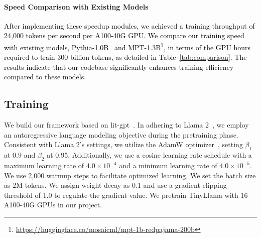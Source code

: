 \documentclass{article}
\begin{document}
\paragraph{Speed Comparison with Existing Models}
\textcolor{black}{
After implementing these speedup modules,
    we achieved a training throughput of 24,000 tokens per second per A100-40G GPU.
We compare our training speed with existing models,
    Pythia-1.0B~\citep{biderman2023pythia} and MPT-1.3B\footnote{\url{https://huggingface.co/mosaicml/mpt-1b-redpajama-200b}},
    in terms of the GPU hours required to train 300 billion tokens, as detailed in Table~\ref{tab:comparison}.
The results indicate that our codebase significantly enhances training efficiency compared to these models.
}
\vspace{-0.5em}
\subsection{Training}
We build our framework based on lit-gpt~\citep{lit-gpt}.
In adhering to Llama 2~\citep{touvron2023llama2}, we employ an autoregressive language modeling objective during the pretraining phase.
Consistent with Llama 2's settings, we utilize the AdamW optimizer~\citep{DBLP:conf/iclr/LoshchilovH19}, setting $\beta_1$ at 0.9 and
$\beta_2 $ at 0.95.
Additionally, we use a cosine learning rate schedule with a maximum learning rate of $4.0\times 10^{-4} $ and a minimum learning rate of $4.0 \times 10 ^ {-5} $.
We use 2,000 warmup steps to facilitate optimized learning.
We set the batch size as 2M tokens.
We assign weight decay as 0.1 and use a gradient clipping threshold of 1.0 to regulate the gradient value.
We pretrain TinyLlama with 16 A100-40G GPUs in our project.
\end{document}
